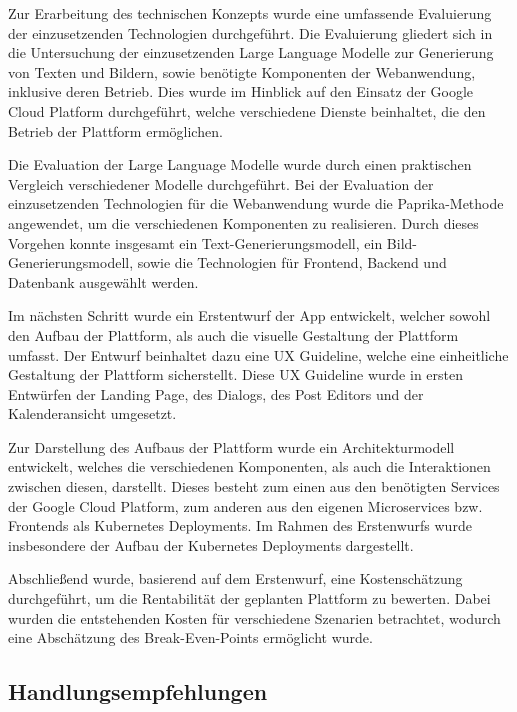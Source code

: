 Zur Erarbeitung des technischen Konzepts wurde eine umfassende Evaluierung der einzusetzenden Technologien durchgeführt.
Die Evaluierung gliedert sich in die Untersuchung der einzusetzenden Large Language Modelle zur Generierung von Texten und Bildern, sowie benötigte Komponenten der Webanwendung, inklusive deren Betrieb.
Dies wurde im Hinblick auf den Einsatz der Google Cloud Platform durchgeführt, welche verschiedene Dienste beinhaltet, die den Betrieb der Plattform ermöglichen.

Die Evaluation der Large Language Modelle wurde durch einen praktischen Vergleich verschiedener Modelle durchgeführt.
Bei der Evaluation der einzusetzenden Technologien für die Webanwendung wurde die Paprika-Methode angewendet, um die verschiedenen Komponenten zu realisieren.
Durch dieses Vorgehen konnte insgesamt ein Text-Generierungsmodell, ein Bild-Generierungsmodell, sowie die Technologien für Frontend, Backend und Datenbank ausgewählt werden.

Im nächsten Schritt wurde ein Erstentwurf der App entwickelt, welcher sowohl den Aufbau der Plattform, als auch die visuelle Gestaltung der Plattform umfasst.
Der Entwurf beinhaltet dazu eine UX Guideline, welche eine einheitliche Gestaltung der Plattform sicherstellt.
Diese UX Guideline wurde in ersten Entwürfen der Landing Page, des Dialogs, des Post Editors und der Kalenderansicht umgesetzt.

Zur Darstellung des Aufbaus der Plattform wurde ein Architekturmodell entwickelt, welches die verschiedenen Komponenten, als auch die Interaktionen zwischen diesen, darstellt.
Dieses besteht zum einen aus den benötigten Services der Google Cloud Platform, zum anderen aus den eigenen Microservices bzw. Frontends als Kubernetes Deployments.
Im Rahmen des Erstenwurfs wurde insbesondere der Aufbau der Kubernetes Deployments dargestellt.

Abschließend wurde, basierend auf dem Erstenwurf, eine Kostenschätzung durchgeführt, um die Rentabilität der geplanten Plattform zu bewerten.
Dabei wurden die entstehenden Kosten für verschiedene Szenarien betrachtet, wodurch eine Abschätzung des Break-Even-Points ermöglicht wurde.

\subsection{Handlungsempfehlungen}

